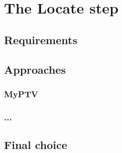 \chapter{The Locate step}
\label{chap:locate}

\section{Requirements}
\section{Approaches}
\subsection{MyPTV}
\subsection{...}
\section{Final choice}
